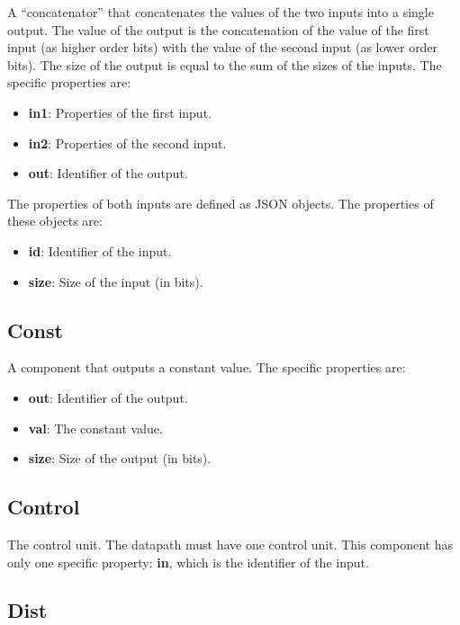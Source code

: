 \documentclass[11pt,a4paper,twoside,titlepage]{report}
\begin{document}
A ``concatenator'' that concatenates the values of the two inputs into a single output.
The value of the output is the concatenation of the value of the first input (as higher
order bits) with the value of the second input (as lower order bits).
The size of the output is equal to the sum of the sizes of the inputs.
The specific properties are:
\begin{itemize}
	\item \textbf{in1}: Properties of the first input.
	\item \textbf{in2}: Properties of the second input.
	\item \textbf{out}: Identifier of the output.
\end{itemize}

The properties of both inputs are defined as JSON objects. The properties of these
objects are:
\begin{itemize}
	\item \textbf{id}: Identifier of the input.
	\item \textbf{size}: Size of the input (in bits).
\end{itemize}

\subsection{Const}

A component that outputs a constant value. The specific properties are:
\begin{itemize}
	\item \textbf{out}: Identifier of the output.
	\item \textbf{val}: The constant value.
	\item \textbf{size}: Size of the output (in bits).
\end{itemize}

\subsection{Control}

The control unit. The datapath must have one control unit.
This component has only one specific property: \textbf{in}, which is
the identifier of the input.

\subsection{Dist}
\end{document}

